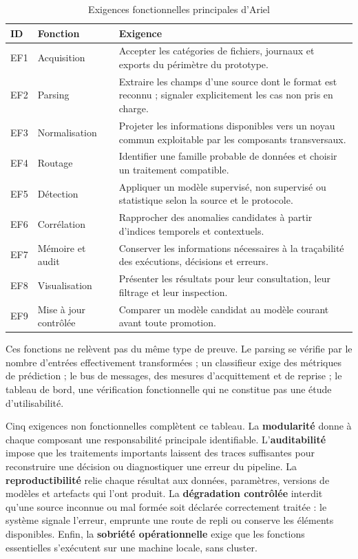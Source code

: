 \begin{table}[H]
\centering
\caption{Exigences fonctionnelles principales d'Ariel \logminer{}}
\label{tab:exigences-fonctionnelles}
\small
\begin{tabularx}{\textwidth}{p{1.0cm}p{3.4cm}X}
\toprule
\textbf{ID} & \textbf{Fonction} & \textbf{Exigence} \\
\midrule
EF1 & Acquisition & Accepter les catégories de fichiers, journaux et exports du périmètre du prototype. \\
EF2 & Parsing & Extraire les champs d'une source dont le format est reconnu ; signaler explicitement les cas non pris en charge. \\
EF3 & Normalisation & Projeter les informations disponibles vers un noyau commun exploitable par les composants transversaux. \\
EF4 & Routage & Identifier une famille probable de données et choisir un traitement compatible. \\
EF5 & Détection & Appliquer un modèle supervisé, non supervisé ou statistique selon la source et le protocole. \\
EF6 & Corrélation & Rapprocher des anomalies candidates à partir d'indices temporels et contextuels. \\
EF7 & Mémoire et audit & Conserver les informations nécessaires à la traçabilité des exécutions, décisions et erreurs. \\
EF8 & Visualisation & Présenter les résultats pour leur consultation, leur filtrage et leur inspection. \\
EF9 & Mise à jour contrôlée & Comparer un modèle candidat au modèle courant avant toute promotion. \\
\bottomrule
\end{tabularx}
\end{table}

Ces fonctions ne relèvent pas du même type de preuve. Le parsing se vérifie par le nombre d'entrées effectivement transformées ; un classifieur exige des métriques de prédiction ; le bus de messages, des mesures d'acquittement et de reprise ; le tableau de bord, une vérification fonctionnelle qui ne constitue pas une étude d'utilisabilité.

Cinq exigences non fonctionnelles complètent ce tableau. La \textbf{modularité} donne à chaque composant une responsabilité principale identifiable. L'\textbf{auditabilité} impose que les traitements importants laissent des traces suffisantes pour reconstruire une décision ou diagnostiquer une erreur du pipeline. La \textbf{reproductibilité} relie chaque résultat aux données, paramètres, versions de modèles et artefacts qui l'ont produit. La \textbf{dégradation contrôlée} interdit qu'une source inconnue ou mal formée soit déclarée correctement traitée : le système signale l'erreur, emprunte une route de repli ou conserve les éléments disponibles. Enfin, la \textbf{sobriété opérationnelle} exige que les fonctions essentielles s'exécutent sur une machine locale, sans cluster.

